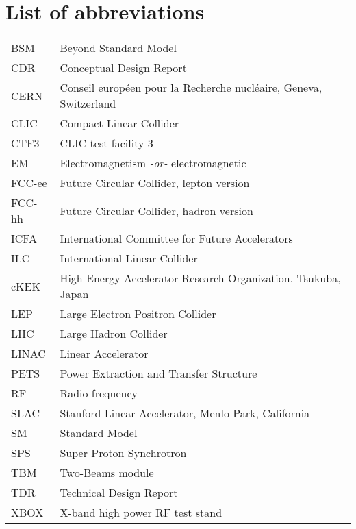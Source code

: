 \chapter*{List of abbreviations}

\begin{tabular}{l l}
BSM		&	Beyond Standard Model\\
CDR		&	Conceptual Design Report\\
CERN	&	Conseil europ\'een pour la Recherche nucl\'eaire, Geneva, Switzerland\\
CLIC		&	Compact Linear Collider\\
CTF3	&	CLIC test facility 3\\
EM		&	Electromagnetism \textit{-or-} electromagnetic\\
FCC-ee	&	Future Circular Collider, lepton version\\
FCC-hh	&	Future Circular Collider, hadron version\\
ICFA		&	International Committee for Future Accelerators\\
ILC		&	International Linear Collider\\
cKEK		&	High Energy Accelerator Research Organization, Tsukuba, Japan      \\  
LEP		&	Large Electron Positron Collider\\
LHC		&	Large Hadron Collider \\
LINAC	&	Linear Accelerator\\
PETS	&	Power Extraction and Transfer Structure\\
RF		&	Radio frequency\\
SLAC	&	Stanford Linear Accelerator, Menlo Park, California\\
SM		&	Standard Model\\
SPS		&	Super Proton Synchrotron\\
TBM		&	Two-Beams module\\
TDR		&	Technical Design Report\\
XBOX	&	X-band high power RF test stand\\
\end{tabular}